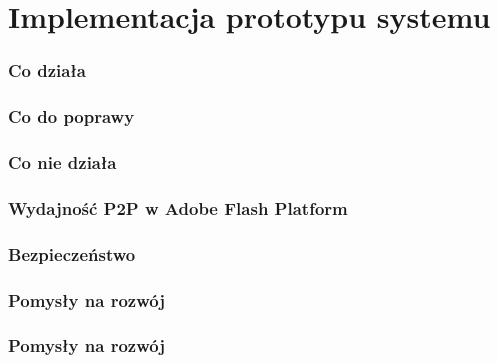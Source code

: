 \chapter{Implementacja prototypu systemu}
\label{cha:ImplementacjaPrototypu}

\subsection{Co działa}
\subsection{Co do poprawy}
\subsection{Co nie działa}
\subsection{Wydajność P2P w Adobe Flash Platform}
\subsection{Bezpieczeństwo}
\subsection{Pomysły na rozwój}
\subsection{Pomysły na rozwój}

\newpage
